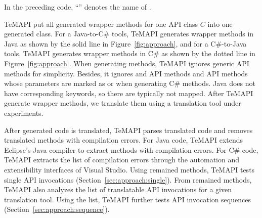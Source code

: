 In the preceding code, ``'' denotes the name of .

TeMAPI put all generated wrapper methods for one API class $C$ into one generated class. For a Java-to-C\# tools, TeMAPI generates wrapper methods in Java as shown by the solid line in Figure~\ref{fig:approach}, and for a C\#-to-Java tools, TeMAPI generates wrapper methods in C\# as shown by the dotted line in Figure~\ref{fig:approach}. When generating methods, TeMAPI ignores generic API methods for simplicity. Besides, it ignores  and  API methods and API methods whose parameters are marked as  or  when generating C\# methods. Java does not have corresponding keywords, so there are typically not mapped. After TeMAPI generate wrapper methods, we translate them using a translation tool under experiments.

After generated code is translated, TeMAPI parses translated code and removes translated methods with compilation errors. For Java code, TeMAPI extends Eclipse's Java compiler to extract methods with compilation errors. For C\# code, TeMAPI extracts the list of compilation errors through the automation and extensibility interfaces of Visual Studio. Using remained methods, TeMAPI tests single API invocations (Section~\ref{sec:approach:single}). From remained methods, TeMAPI also analyzes the list of translatable API invocations for a given translation tool. Using the list, TeMAPI further tests API invocation sequences (Section~\ref{sec:approach:sequence}).


%


